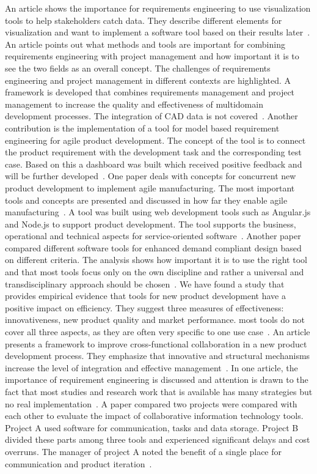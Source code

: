     An article shows the importance for requirements engineering to use visualization tools to help stakeholders catch data. They describe different elements for visualization and want to implement a software tool based on their results later~\cite{RICHTER2020271}.
    An article points out what methods and tools are important for combining requirements engineering with project management and how important it is to see the two fields as an overall concept. The challenges of requirements engineering and project management in different contexts are highlighted. A framework is developed that combines requirements management and project management to increase the quality and effectiveness of multidomain development processes. The integration of CAD data is not covered~\cite{Jorma2014}.
    Another contribution is the implementation of a tool for model based requirement engineering for agile product development. The concept of the tool is to connect the product requirement with the development task and the corresponding test case. Based on this a dashboard was built which received positive feedback and will be further developed~\cite{WINDISCH2022550}.
    One paper deals with concepts for concurrent new product development to implement agile manufacturing. The most important tools and concepts are presented and discussed in how far they enable agile manufacturing~\cite{buyukozkan2004survey}.
    A tool was built using web development tools such as Angular.js and Node.js to support product development. The tool supports the business, operational and technical aspects for service-oriented software~\cite{belfadel2022requirements}.
    Another paper compared different software tools for enhanced demand compliant design based on different criteria. The analysis shows how important it is to use the right tool and that most tools focus only on the own discipline and rather a universal and transdisciplinary approach should be chosen~\cite{9447081}.
    We have found a study that provides empirical evidence that tools for new product development have a positive impact on efficiency. They suggest three measures of effectiveness: innovativeness, new product quality and market performance. most tools do not cover all three aspects, as they are often very specific to one use case~\cite{DURMUSOGLU2011321}.
    An article presents a framework to improve cross-functional collaboration in a new product development process. They emphasize that innovative and structural mechanisms increase the level of integration and effective management~\cite{Jassawalla}.
    In one article, the importance of requirement engineering is discussed and attention is drawn to the fact that most studies and research work that is available has many strategies but no real implementation~\cite{kumar2022requirements}.
    A paper compared two projects were compared with each other to evaluate the impact of collaborative information technology tools. Project A used software for communication, tasks and data storage. Project B divided these parts among three tools and experienced significant delays and cost overruns. The manager of project A noted the benefit of a single place for communication and product iteration~\cite{marion_fixson_2019}.

